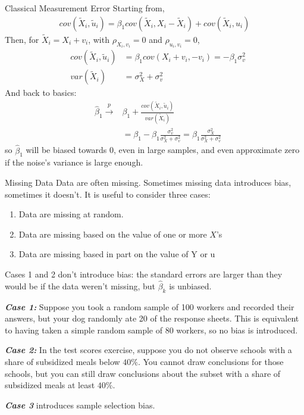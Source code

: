 \documentclass[notes,10pt, aspectratio=169]{beamer}
\begin{document}
\begin{frame}{Classical Measurement Error}
Starting from,
\begin{eqnarray*}
    cov(\tilde{X}_i, \tilde{u}_i) = \beta_1 cov(\tilde{X}_i, X_i-\tilde{X}_i) + cov(\tilde{X}_i, u_i)
\end{eqnarray*}
Then, for $\tilde{X}_i=X_i+v_i$,  with $\rho_{X_i, v_i}=0$ and $\rho_{u_i, v_i}=0$,
\begin{eqnarray*}
        &cov(\tilde{X}_i, \tilde{u}_i) &= \beta_1 cov(X_i+v_i, -v_i)=-\beta_1\sigma_v^2\\
        &var(\tilde{X}_i)&=\sigma_X^2 + \sigma_v^2
\end{eqnarray*}
And back to basics:
\begin{eqnarray*}
        &\hat{\beta}_1 \overset{p}{\to} & \beta_1 + \frac{cov(\tilde{X}_i, \tilde{u}_i)}{var(\tilde{X}_i)}\\
        & {} &= \beta_1 -\beta_1\frac{\sigma_v^2}{\sigma_X^2 + \sigma_v^2} = \beta_1  \frac{\sigma_X^2}{\sigma_X^2 + \sigma_v^2}
\end{eqnarray*}
so $\hat{\beta}_1$ will be biased towards 0, even in large samples, and even approximate zero if the noise's variance is large enough.
\end{frame}

\begin{frame}{Missing Data}
Data are often missing. Sometimes missing data introduces bias, sometimes it doesn’t. It is useful to consider three cases:
\begin{enumerate}
    \item Data are missing at random.
    \item Data are missing based on the value of one or more $X$’s
    \item Data are missing based in part on the value of Y or u
\end{enumerate}
\vspace{1em}
Cases 1 and 2 don’t introduce bias: the standard errors are larger than they would be if the data weren’t missing, but $\hat{\beta}_k$ is unbiased.

\textbf{\textit{Case 1:}} Suppose you took a random sample of 100 workers and recorded their answers, but your dog randomly ate 20 of the response sheets. This is equivalent to having taken a simple random sample of 80 workers, so no bias is introduced.

\vspace{0.5em}
\textbf{\textit{Case 2:}} In the test scores exercise, suppose you do not observe schools with a share of subsidized meals below $40\%$. You cannot draw conclusions for those schools, but you can still draw conclusions about the subset with a share of subsidized meals at least $40\%$.

\vspace{0.5em}
\textbf{\textit{Case 3}} introduces sample selection bias.

\end{frame}
\end{document}
